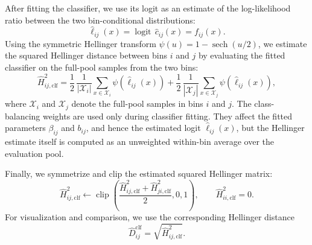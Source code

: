 After fitting the classifier, we use its logit as an estimate of the log-likelihood ratio between the two bin-conditional distributions:
\begin{equation}
    \widehat{\ell}_{ij}(x)
    =
    \operatorname{logit}\,\widehat c_{ij}(x)
    =
    f_{ij}(x).
\end{equation}
Using the symmetric Hellinger transform $\psi(u)=1-\operatorname{sech}(u/2)$, we estimate the squared Hellinger distance between bins $i$ and $j$ by evaluating the fitted classifier on the full-pool samples from the two bins:
\begin{equation}
\label{eq:implemented-clf-h2}
    \widehat H^2_{ij,\mathrm{clf}}
    =
    \frac{1}{2}\,\frac{1}{|\mathcal X_i|}
    \sum_{x\in \mathcal X_i}
    \psi\!\left(\widehat{\ell}_{ij}(x)\right)
    +
    \frac{1}{2}\,\frac{1}{|\mathcal X_j|}
    \sum_{x\in \mathcal X_j}
    \psi\!\left(\widehat{\ell}_{ij}(x)\right),
\end{equation}
where $\mathcal X_i$ and $\mathcal X_j$ denote the full-pool samples in bins $i$ and $j$. The class-balancing weights are used only during classifier fitting. They affect the fitted parameters $\beta_{ij}$ and $b_{ij}$, and hence the estimated logit $\widehat{\ell}_{ij}(x)$, but the Hellinger estimate itself is computed as an unweighted within-bin average over the evaluation pool.

Finally, we symmetrize and clip the estimated squared Hellinger matrix:
\begin{equation}
    \widehat H^2_{ij,\mathrm{clf}}
    \leftarrow
    \operatorname{clip}\!\left(
    \frac{\widehat H^2_{ij,\mathrm{clf}}+\widehat H^2_{ji,\mathrm{clf}}}{2},
    0,1
    \right),
    \qquad
    \widehat H^2_{ii,\mathrm{clf}}=0.
\end{equation}
For visualization and comparison, we use the corresponding Hellinger distance
\begin{equation}
    \widehat D^{\mathrm{clf}}_{ij}
    =
    \sqrt{\widehat H^2_{ij,\mathrm{clf}}}.
\end{equation}
